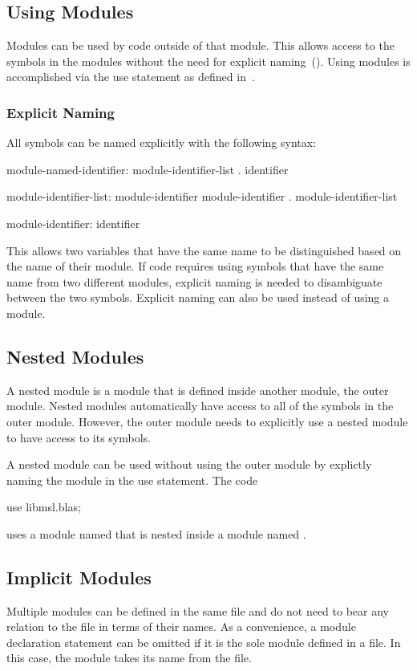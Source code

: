 \subsection{Using Modules}
\label{Using_Modules}

Modules can be used by code outside of that module.  This allows
access to the symbols in the modules without the need for explicit
naming~().  Using modules is accomplished via
the use statement as defined in~.

\subsubsection{Explicit Naming}
\label{Explicit_Naming}

All symbols can be named explicitly with the following syntax:
\begin{syntax}
module-named-identifier:
  module-identifier-list . identifier

module-identifier-list:
  module-identifier
  module-identifier . module-identifier-list

module-identifier:
  identifier
\end{syntax}
This allows two variables that have the same name to be distinguished
based on the name of their module.  If code requires using symbols
that have the same name from two different modules, explicit naming is
needed to disambiguate between the two symbols.  Explicit naming can
also be used instead of using a module.

\subsection{Nested Modules}
\label{Nested_Modules}

A nested module is a module that is defined inside another module, the
outer module.  Nested modules automatically have access to all of the
symbols in the outer module.  However, the outer module needs to
explicitly use a nested module to have access to its symbols.

\begin{example}
A nested module can be used without using the outer module by
explictly naming the module in the use statement.  The code
\begin{chapel}
use libmsl.blas;
\end{chapel}
uses a module named  that is nested inside a module
named .
\end{example}

\subsection{Implicit Modules}
\label{Implicit_Modules}

Multiple modules can be defined in the same file and do not need to
bear any relation to the file in terms of their names.  As a
convenience, a module declaration statement can be omitted if it is
the sole module defined in a file.  In this case, the module takes its
name from the file.
